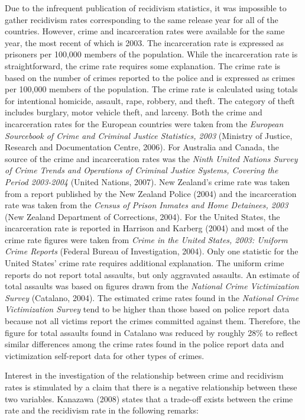 Due to the infrequent publication of recidivism statistics, it was impossible to gather recidivism rates corresponding to the same release year for all of the countries.  However, crime and incarceration rates were available for the same year, the most recent of which is 2003.  The incarceration rate is expressed as prisoners per 100,000 members of the population.  While the incarceration rate is straightforward, the crime rate requires some explanation. The crime rate is based on the number of crimes reported to the police and is expressed as crimes per 100,000 members of the population.  The crime rate is calculated using totals for intentional homicide, assault, rape, robbery, and theft.  The category of theft includes burglary, motor vehicle theft, and larceny.  Both the crime and incarceration rates for the European countries were taken from the \emph{European Sourcebook of Crime and Criminal Justice Statistics, 2003} (Ministry of Justice, Research and Documentation Centre, 2006).  For Australia and Canada, the source of the crime and incarceration rates was the \emph{Ninth United Nations Survey of Crime Trends and Operations of Criminal Justice Systems, Covering the Period 2003-2004} (United Nations, 2007).  New Zealand's crime rate was taken from a report published by the New Zealand Police (2004) and the incarceration rate was taken from the \emph{Census of Prison Inmates and Home Detainees, 2003} (New Zealand Department of Corrections, 2004).  For the United States, the incarceration rate is reported in Harrison and Karberg (2004) and most of the crime rate figures were taken from \emph{Crime in the United States, 2003: Uniform Crime Reports} (Federal Bureau of Investigation, 2004).  Only one statistic for the United States' crime rate requires additional explanation.  The uniform crime reports do not report total assaults, but only aggravated assaults.  An estimate of total assaults was based on figures drawn from the \emph{National Crime Victimization Survey} (Catalano, 2004).  The estimated crime rates found in the \emph{National Crime Victimization Survey} tend to be higher than those based on police report data because not all victims report the crimes committed against them.  Therefore, the figure for total assaults found in Catalano was reduced by roughly 28\% to reflect similar differences among the crime rates found in the police report data and victimization self-report data for other types of crimes.

Interest in the investigation of the relationship between crime and recidivism rates is stimulated by a claim that there is a negative relationship between these two variables.  Kanazawa (2008) states that a trade-off exists between the crime rate and the recidivism rate in the following remarks:

